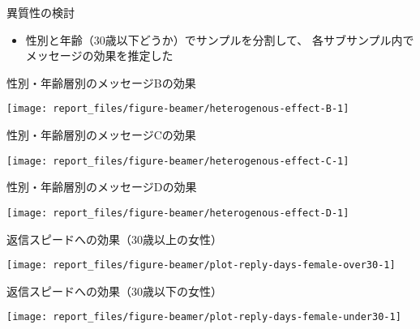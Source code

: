 \documentclass[
      aspectratio=169,
        12pt,
    ]{beamer}
\providecommand{\tightlist}{%
  \setlength{\itemsep}{0pt}\setlength{\parskip}{0pt}}
\begin{document}
\begin{frame}{異質性の検討}
\protect\hypertarget{ux7570ux8ceaux6027ux306eux691cux8a0e}{}
\begin{itemize}
\tightlist
\item
  性別と年齢（30歳以下どうか）でサンプルを分割して、
  各サブサンプル内でメッセージの効果を推定した
\end{itemize}
\end{frame}

\begin{frame}{性別・年齢層別のメッセージBの効果}
\protect\hypertarget{ux6027ux5225ux5e74ux9f62ux5c64ux5225ux306eux30e1ux30c3ux30bbux30fcux30b8bux306eux52b9ux679c}{}
\begin{center}\texttt{[image: report\_files/figure-beamer/heterogenous-effect-B-1]} \end{center}
\end{frame}

\begin{frame}{性別・年齢層別のメッセージCの効果}
\protect\hypertarget{ux6027ux5225ux5e74ux9f62ux5c64ux5225ux306eux30e1ux30c3ux30bbux30fcux30b8cux306eux52b9ux679c}{}
\begin{center}\texttt{[image: report\_files/figure-beamer/heterogenous-effect-C-1]} \end{center}
\end{frame}

\begin{frame}{性別・年齢層別のメッセージDの効果}
\protect\hypertarget{ux6027ux5225ux5e74ux9f62ux5c64ux5225ux306eux30e1ux30c3ux30bbux30fcux30b8dux306eux52b9ux679c}{}
\begin{center}\texttt{[image: report\_files/figure-beamer/heterogenous-effect-D-1]} \end{center}
\end{frame}

\begin{frame}{返信スピードへの効果（30歳以上の女性）}
\protect\hypertarget{ux8fd4ux4fe1ux30b9ux30d4ux30fcux30c9ux3078ux306eux52b9ux679c30ux6b73ux4ee5ux4e0aux306eux5973ux6027}{}
\begin{center}\texttt{[image: report\_files/figure-beamer/plot-reply-days-female-over30-1]} \end{center}
\end{frame}

\begin{frame}{返信スピードへの効果（30歳以下の女性）}
\protect\hypertarget{ux8fd4ux4fe1ux30b9ux30d4ux30fcux30c9ux3078ux306eux52b9ux679c30ux6b73ux4ee5ux4e0bux306eux5973ux6027}{}
\begin{center}\texttt{[image: report\_files/figure-beamer/plot-reply-days-female-under30-1]} \end{center}
\end{frame}
\end{document}
